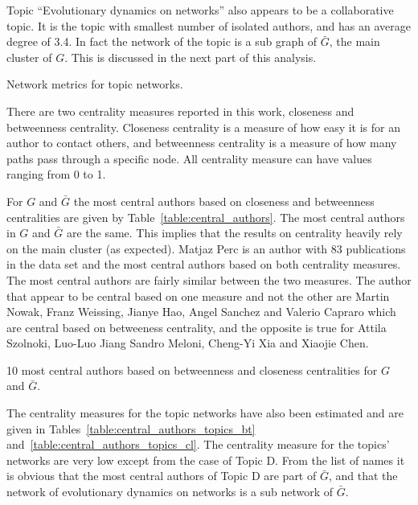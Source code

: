 \documentclass{article}
\theoremstyle{definition}
\begin{document}
Topic ``Evolutionary dynamics on networks'' also appears to be a collaborative
topic. It is the topic with smallest number of isolated authors, and has an
average degree of 3.4. In fact the network of the topic is a
sub graph of \(\bar{G}\), the main cluster of $G$. This is discussed in the next
part of this analysis.

\begin{table}[H]
    \centering
    \resizebox{\textwidth}{!}{
    }
    \caption{Network metrics for topic networks.}\label{table:topics_networks}
\end{table}

There are two centrality measures reported in this work, closeness and
betweenness centrality. Closeness centrality is a measure of how easy it is for
an author to contact others, and betweenness centrality is a
measure of how many paths pass through a specific node. All centrality measure can
have values ranging from 0 to 1.

For \(G\) and \(\bar{G}\) the most central authors based on closeness and
betweenness centralities are given by Table~\ref{table:central_authors}. The
most central authors in \(G\) and \(\bar{G}\) are the same. This implies that
the results on centrality heavily rely on the main cluster (as expected). Matjaz Perc is an
author with 83 publications in the data set and the most central authors based
on both centrality measures. The most central authors are fairly similar between
the two measures. The author that appear to be central based on one measure and
not the other are Martin Nowak, Franz Weissing, Jianye Hao, Angel Sanchez and
Valerio Capraro which are central based on betweeness centrality, and 
the opposite is true for Attila Szolnoki, Luo-Luo Jiang Sandro Meloni, Cheng-Yi
Xia and Xiaojie Chen.

\begin{table}[!hbtp]
    \begin{center}
    \resizebox{.9\textwidth}{!}{}
\end{center}
\caption{10 most central authors based on betweenness and closeness centralities
for \(G\) and \(\bar{G}\).}\label{table:central_authors}
\end{table}

The
centrality measures for the topic networks have also been estimated and are
given in Tables~\ref{table:central_authors_topics_bt}
and~\ref{table:central_authors_topics_cl}. The centrality measure for the
topics' networks are very low  except from the case of Topic D. From the
list of names it is obvious that the most central authors of Topic D are part of \(\bar{G}\), and that
the network of evolutionary dynamics on networks is a sub network of \(\bar{G}\).
\end{document}
